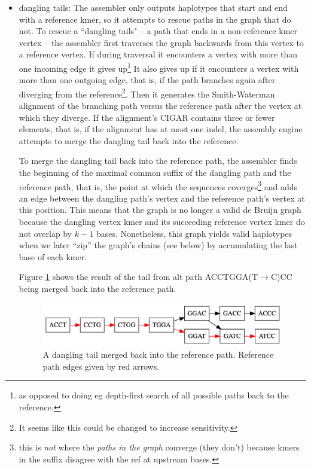 \documentclass[nofootinbib,amssymb,amsmath]{revtex4}
\begin{document}
\begin{itemize}
\item dangling tails: The assembler only outputs haplotypes that start and end with a reference kmer, so it attempts to rescue paths in the graph that do not.  To rescue a ``dangling tails" -- a path that ends in a non-reference kmer vertex -- the assembler first traverses the graph backwards from this vertex to a reference vertex.  If during traversal it encounters a vertex with more than one incoming edge it gives up\footnote{as opposed to doing eg depth-first search of all possible paths back to the reference.}  It also gives up if it encounters a vertex with more than one outgoing edge, that is, if the path branches again after diverging from the reference\footnote{It seems like this could be changed to increase sensitivity.}.  Then it generates the Smith-Waterman alignment of the branching path versus the reference path after the vertex at which they diverge.  If the alignment's CIGAR contains three or fewer elements, that is, if the alignment has at most one indel, the assembly engine attempts to merge the dangling tail back into the reference.

To merge the dangling tail back into the reference path, the assembler finds the beginning of the maximal common suffix of the dangling path and the reference path, that is, the point at which the sequences coverges\footnote{this is \textit{not} where the \textit{paths in the graph} converge (they don't) because kmers in the suffix disagree with the ref at upstream bases.} and adds an edge between the dangling path's vertex and the reference path's vertex at this position.  This means that the graph is no longer a valid de Bruijn graph because the dangling vertex kmer and its succeeding reference vertex kmer do not overlap by $k - 1$ bases.  Nonetheless, this graph yields valid haplotypes when we later ``zip'' the graph's chains (see below) by accumulating the last base of each kmer.

Figure \ref{fig:dangling} shows the result of the tail from alt path ACCTGGA(T$\rightarrow$C)CC being merged back into the reference path.

\begin{figure}
\center
\includegraphics[scale=0.5]{dangling_tail.png}
\caption{A dangling tail merged back into the reference path.  Reference path edges given by red arrows.}
\label{fig:dangling}
\end{figure}


\end{itemize}
\end{document}
